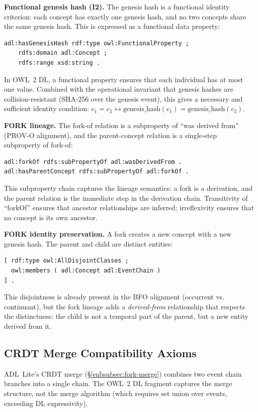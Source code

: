 \textbf{Functional genesis hash (I2).}
The genesis hash is a functional identity criterion: each concept has exactly one genesis hash, and no two concepts share the same genesis hash. This is expressed as a functional data property:
\begin{verbatim}
adl:hasGenesisHash rdf:type owl:FunctionalProperty ;
    rdfs:domain adl:Concept ;
    rdfs:range xsd:string .
\end{verbatim}
In OWL~2 DL, a functional property ensures that each individual has at most one value. Combined with the operational invariant that genesis hashes are collision-resistant (SHA-256 over the genesis event), this gives a necessary and sufficient identity condition: $c_1 = c_2 \leftrightarrow \text{genesis\_hash}(c_1) = \text{genesis\_hash}(c_2)$.

\textbf{FORK lineage.}
The fork-of relation is a subproperty of ``was derived from'' (PROV-O alignment), and the parent-concept relation is a single-step subproperty of fork-of:
\begin{verbatim}
adl:forkOf rdfs:subPropertyOf adl:wasDerivedFrom .
adl:hasParentConcept rdfs:subPropertyOf adl:forkOf .
\end{verbatim}
This subproperty chain captures the lineage semantics: a fork is a derivation, and the parent relation is the immediate step in the derivation chain. Transitivity of ``forkOf'' ensures that ancestor relationships are inferred; irreflexivity ensures that no concept is its own ancestor.

\textbf{FORK identity preservation.}
A fork creates a new concept with a new genesis hash. The parent and child are distinct entities:
\begin{verbatim}
[ rdf:type owl:AllDisjointClasses ;
  owl:members ( adl:Concept adl:EventChain )
] .
\end{verbatim}
This disjointness is already present in the BFO alignment (occurrent vs. continuant), but the fork lineage adds a \emph{derived-from} relationship that respects the distinctness: the child is not a temporal part of the parent, but a new entity derived from it.

\subsection{CRDT Merge Compatibility Axioms}

ADL~Lite's CRDT merge (\S\ref{subsubsec:fork-merge}) combines two event chain branches into a single chain. The OWL~2 DL fragment captures the merge structure, not the merge algorithm (which requires set union over events, exceeding DL expressivity).

